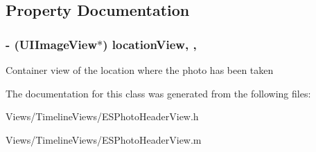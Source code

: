 \subsection{Property Documentation}
\hypertarget{interface_e_s_photo_header_view_aaf1493f6259e310bc78058308b68e068}{}
\subsubsection[{location\+View}]{\setlength{\rightskip}{0pt plus 5cm}-\/ (U\+I\+Image\+View$\ast$) location\+View\hspace{0.3cm}{\ttfamily [read]}, {\ttfamily [nonatomic]}, {\ttfamily [assign]}}\label{interface_e_s_photo_header_view_aaf1493f6259e310bc78058308b68e068}
Container view of the location where the photo has been taken 

The documentation for this class was generated from the following files\+:\begin{DoxyCompactItemize}
\item 
Views/\+Timeline\+Views/E\+S\+Photo\+Header\+View.\+h\item 
Views/\+Timeline\+Views/E\+S\+Photo\+Header\+View.\+m\end{DoxyCompactItemize}
